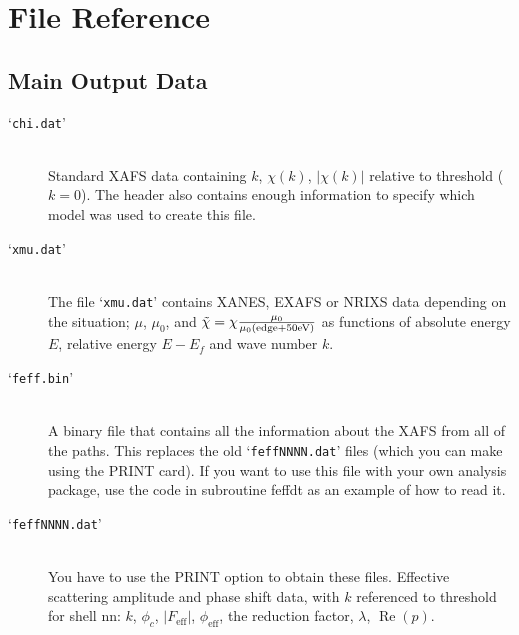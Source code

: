 \documentclass[11pt,oneside]{report} %
\newcommand{\file}[1]{`\texttt{#1}'}
\renewcommand{\Re}{\operatorname{Re}}
\begin{document}
\begin{latexonly}
\begin{description}
\end{description}



\section{File Reference}
\label{sec:Descr-Outp-Files}

\subsection{Main Output Data}
\label{sec:Final-Results-Calc}

\begin{description}
\item[\file{chi.dat}]\hfill\\ Standard XAFS data containing $k$,
  $\chi(k)$, $|\chi(k)|$ relative to threshold ($k=0$). The header
  also contains enough information to specify which model was used to
  create this file.
\item[\file{xmu.dat}]\hfill\\ The file \file{xmu.dat} contains XANES, EXAFS or NRIXS
   data depending on the situation; $\mu$, $\mu_0$, and 
  $\tilde \chi = \chi \frac{\mu_0}{\mu_0({\rm edge} + 50 {\rm eV})}$ 
  as functions of absolute energy
  $E$, relative energy $E-E_f$ and wave number $k$.
\item[\file{feff.bin}] \hfill\\ A binary file that contains all the
  information about the XAFS from all of the paths. This replaces the
  old \file{feffNNNN.dat} files (which you can make using the PRINT
  card). If you want to use this file with your own analysis package,
  use the code in subroutine feffdt as an example of how to read it.
\item[\file{feffNNNN.dat}]\hfill\\ You have to use the PRINT option to
  obtain these files. Effective scattering amplitude and phase shift
  data, with $k$ referenced to threshold for shell nn: $k$, $\phi_c$,
  $|F_{\mathrm{eff}}|$, $\phi_{\mathrm{eff}}$, the reduction factor,
  $\lambda$, $\Re(p)$.


\end{description}
\end{latexonly}
\end{document}
